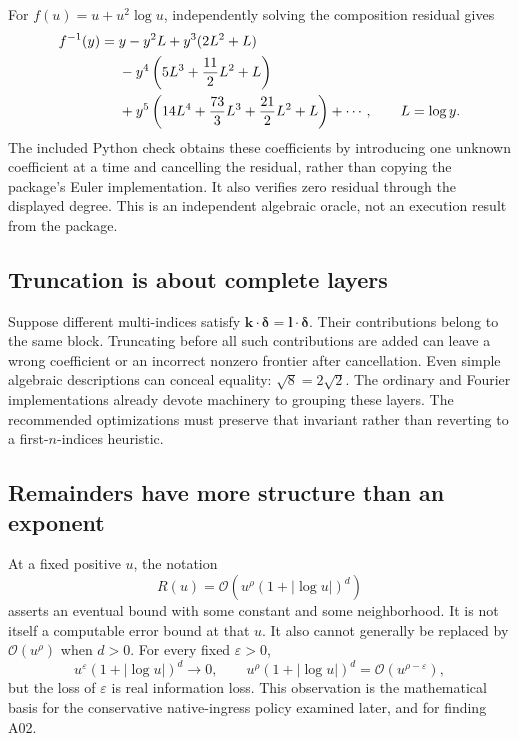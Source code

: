 \documentclass[11pt,a4paper]{article}
\newcommand{\OO}{\mathcal O}
\begin{document}
For $f(u)=u+u^2\log u$, independently solving the composition residual gives
\begin{align}
 f^{-1}(y)={}&y-y^2L+y^3(2L^2+L)\notag\\
 &-y^4\left(5L^3+\frac{11}{2}L^2+L\right)\notag\\
 &+y^5\left(14L^4+\frac{73}{3}L^3+\frac{21}{2}L^2+L\right)
 +\cdots,\qquad L=\log y.
 \label{eq:logoracle}
\end{align}
The included Python check obtains these coefficients by introducing one
unknown coefficient at a time and cancelling the residual, rather than
copying the package's Euler implementation. It also verifies zero residual
through the displayed degree. This is an independent algebraic oracle,
not an execution result from the package.

\subsection{Truncation is about complete layers}
Suppose different multi-indices satisfy
$\boldsymbol{k}\cdot\boldsymbol\delta=
\boldsymbol{l}\cdot\boldsymbol\delta$. Their contributions belong to the
same block. Truncating before all such contributions are added can leave a
wrong coefficient or an incorrect nonzero frontier after cancellation.
Even simple algebraic descriptions can conceal equality:
$\sqrt8=2\sqrt2$. The ordinary and Fourier implementations already devote
machinery to grouping these layers. The recommended optimizations must
preserve that invariant rather than reverting to a first-$n$-indices
heuristic.\cite{core,fourier,refinement}

\subsection{Remainders have more structure than an exponent}
At a fixed positive $u$, the notation
\[
 R(u)=\OO\!\left(u^\rho(1+|\log u|)^d\right)
\]
asserts an eventual bound with some constant and some neighborhood. It is not
itself a computable error bound at that $u$. It also cannot generally be
replaced by $\OO(u^\rho)$ when $d>0$. For every fixed $\varepsilon>0$,
\begin{equation}
 u^\varepsilon(1+|\log u|)^d\longrightarrow0,
 \qquad
 u^\rho(1+|\log u|)^d=\OO(u^{\rho-\varepsilon}),
 \label{eq:epsilon}
\end{equation}
but the loss of $\varepsilon$ is real information loss. This observation is
the mathematical basis for the conservative native-ingress policy examined
later, and for finding A02.
\end{document}
